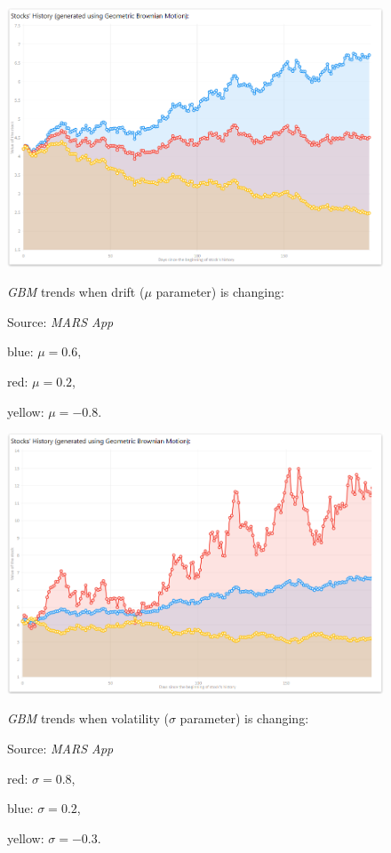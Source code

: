         \begin{figure}[H]
            \centering
            \includegraphics[width=\textwidth]{img/gbm_dri_06_02andm08.png}
            \caption{\textit{GBM} trends when drift ($\mu$ parameter) is changing:}
            \caption*{Source: \textit{MARS App}}
            \caption*{blue: $\mu = 0.6$,}
            \caption*{red: $\mu = 0.2$,}
            \caption*{yellow: $\mu = -0.8$.}
            \label{fig:gbm_dri}
        \end{figure}
        
        \begin{figure}[H]
            \centering
            \includegraphics[width=\textwidth]{img/gbm_vol_08_02andm03.png}
            \caption{\textit{GBM} trends when volatility ($\sigma$ parameter) is changing:}
            \caption*{Source: \textit{MARS App}}
            \caption*{red: $\sigma = 0.8$,}
            \caption*{blue: $\sigma = 0.2$,}
            \caption*{yellow: $\sigma = -0.3$.}
            \label{fig:gbm_vol}
        \end{figure}
    
